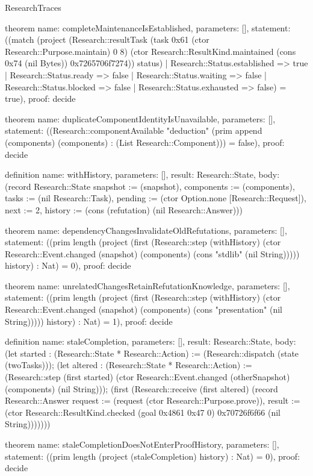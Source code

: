 \begin{lexlean}{ResearchTraces}
\begin{semanticmodule}
theorem{
  name: completeMaintenanceIsEstablished,
  parameters: [],
  statement: ((match (project (Research::resultTask (task 0x61 (ctor Research::Purpose.maintain) 0 8) (ctor Research::ResultKind.maintained (cons 0x74 (nil Bytes)) 0x7265706f7274)) status) | Research::Status.established => true | Research::Status.ready => false | Research::Status.waiting => false | Research::Status.blocked => false | Research::Status.exhausted => false) = true),
  proof: decide{}
}

theorem{
  name: duplicateComponentIdentityIsUnavailable,
  parameters: [],
  statement: ((Research::componentAvailable "deduction" (prim append (components) (components) : (List Research::Component))) = false),
  proof: decide{}
}

definition{
  name: withHistory,
  parameters: [],
  result: Research::State,
  body: (record Research::State {snapshot := (snapshot), components := (components), tasks := (nil Research::Task), pending := (ctor Option.none [Research::Request]), next := 2, history := (cons (refutation) (nil Research::Answer))})
}

theorem{
  name: dependencyChangesInvalidateOldRefutations,
  parameters: [],
  statement: ((prim length (project (first (Research::step (withHistory) (ctor Research::Event.changed (snapshot) (components) (cons "stdlib" (nil String))))) history) : Nat) = 0),
  proof: decide{}
}

theorem{
  name: unrelatedChangesRetainRefutationKnowledge,
  parameters: [],
  statement: ((prim length (project (first (Research::step (withHistory) (ctor Research::Event.changed (snapshot) (components) (cons "presentation" (nil String))))) history) : Nat) = 1),
  proof: decide{}
}

definition{
  name: staleCompletion,
  parameters: [],
  result: Research::State,
  body: (let started : (Research::State * Research::Action) := (Research::dispatch (state (twoTasks))); (let altered : (Research::State * Research::Action) := (Research::step (first started) (ctor Research::Event.changed (otherSnapshot) (components) (nil String))); (first (Research::receive (first altered) (record Research::Answer {request := (request (ctor Research::Purpose.prove)), result := (ctor Research::ResultKind.checked (goal 0x4861 0x47 0) 0x70726f6f66 (nil String))})))))
}

theorem{
  name: staleCompletionDoesNotEnterProofHistory,
  parameters: [],
  statement: ((prim length (project (staleCompletion) history) : Nat) = 0),
  proof: decide{}
}
\end{semanticmodule}
\end{lexlean}

